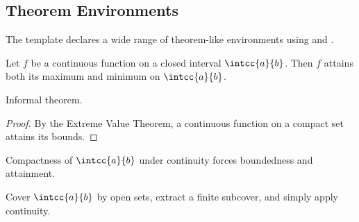 \subsection{Theorem Environments}

The template declares a wide range of theorem-like environments using  and .

\begin{theorem}\label{thm:theorem}
  Let $f$ be a continuous function on a closed interval $\intcc{a}{b}$. Then $f$ attains both its maximum and minimum on $\intcc{a}{b}$.
\end{theorem}
\begin{informaltheorem}\label{thm:informalTheorem}
  Informal theorem.
\end{informaltheorem}
\begin{proof}
  By the Extreme Value Theorem, a continuous function on a compact set attains its bounds.
\end{proof}
\begin{proofidea}
  Compactness of $\intcc{a}{b}$ under continuity forces boundedness and attainment.
\end{proofidea}
\begin{proofsketch}
  Cover $\intcc{a}{b}$ by open sets, extract a finite subcover, and simply apply continuity.
\end{proofsketch}


